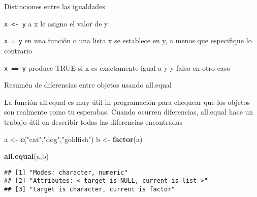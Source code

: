 \documentclass[ignorenonframetext,]{beamer}
\newenvironment{Shaded}{\begin{snugshade}}{\end{snugshade}}
\newcommand{\KeywordTok}[1]{\textcolor[rgb]{0.13,0.29,0.53}{\textbf{#1}}}
\newcommand{\StringTok}[1]{\textcolor[rgb]{0.31,0.60,0.02}{#1}}
\newcommand{\NormalTok}[1]{#1}
\begin{document}
\begin{frame}[fragile]{Distinciones entre las igualdades}

\texttt{x\ \textless{}-\ y} a x le asigno el valor de y

\texttt{x\ =\ y} en una función o una lista x se establece en y, a menos
que especifique lo contrario

\texttt{x\ ==\ y} produce TRUE si x es exactamente igual a y y falso en
otro caso

\end{frame}

\begin{frame}[fragile]{Resumén de diferencias entre objetos usando
all.equal}

La función all.equal es muy útil in programación para chequear que los
objetos son realmente como tu esperabas. Cuando ocurren diferencias,
all.equal hace un trabajo útil en describir todas las diferencias
encontradas

\begin{Shaded}
\begin{Highlighting}[]
\NormalTok{a <-}\StringTok{ }\KeywordTok{c}\NormalTok{(}\StringTok{"cat"}\NormalTok{,}\StringTok{"dog"}\NormalTok{,}\StringTok{"goldfish"}\NormalTok{)}
\NormalTok{b <-}\StringTok{ }\KeywordTok{factor}\NormalTok{(a)}
\end{Highlighting}
\end{Shaded}

\begin{Shaded}
\begin{Highlighting}[]
\KeywordTok{all.equal}\NormalTok{(a,b)}
\end{Highlighting}
\end{Shaded}

\begin{verbatim}
## [1] "Modes: character, numeric"                      
## [2] "Attributes: < target is NULL, current is list >"
## [3] "target is character, current is factor"
\end{verbatim}

\end{frame}
\end{document}
